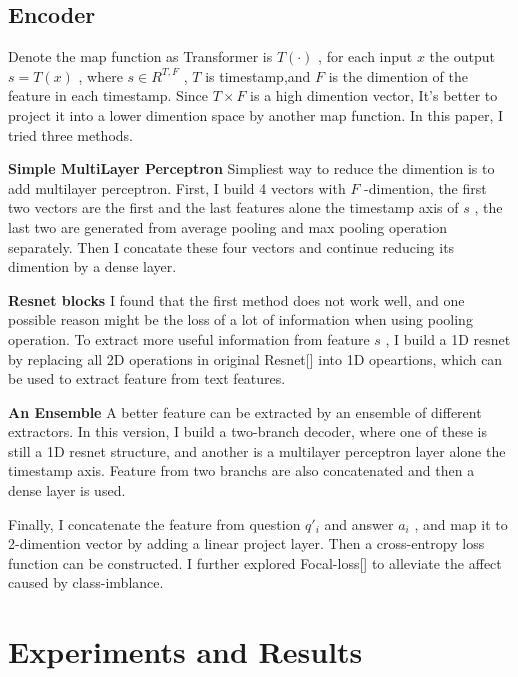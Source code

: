 \documentclass[10pt,twocolumn,letterpaper]{article}
\begin{document}
%

%
\subsection{Encoder}%

%
Denote the map function as Transformer is  $T(\cdot)$ , for each input  $x$  the output  $s=T(x)$ , where  $s\in R^{T,F}$ ,  $T$  is timestamp,and  $F$  is the dimention of the feature in each timestamp. Since  $T \times F$  is a high dimention vector, It's better to project it into a lower dimention space by another map function. In this paper, I tried three methods.%

%

%
\textbf{Simple MultiLayer Perceptron} Simpliest way to reduce the dimention is to add multilayer perceptron. First, I build 4 vectors with  $F$ {-}dimention, the first two vectors are the first and the last features alone the timestamp axis of  $s$ , the last two are generated from average pooling and max pooling operation separately. Then I concatate these four vectors and continue reducing its dimention by a dense layer.%

%
\textbf{Resnet blocks} I found that the first method does not work well, and one possible reason might be the loss of a lot of information when using pooling operation. To extract more useful information from feature  $s$ , I build a 1D resnet by replacing all 2D operations in original Resnet{[}{]} into 1D opeartions, which can be used to extract feature from text features.%

%

%
\textbf{An Ensemble} A better feature can be extracted by an ensemble of different extractors. In this version, I build a two{-}branch decoder, where one of these is still a 1D resnet structure, and another is a multilayer perceptron layer alone the timestamp axis. Feature from two branchs are also concatenated and then a dense layer is used.%

%

%
Finally, I concatenate the feature from question  $q'_i$  and answer  $a_i$ , and map it to 2{-}dimention vector by adding a linear project layer. Then a cross{-}entropy loss function can be constructed. I further explored Focal{-}loss{[}{]} to alleviate the affect caused by class{-}imblance.%

%

%
\section{Experiments and Results}%
\end{document}
